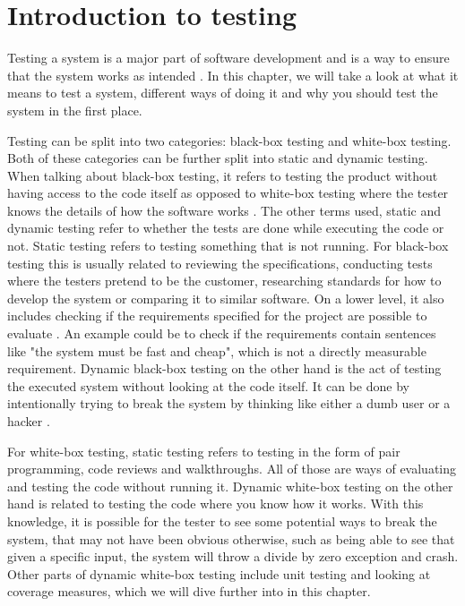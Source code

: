 \section{Introduction to testing}
Testing a system is a major part of software development and is a way to ensure that the system works as intended \cite{SoftwareTesting}.
In this chapter, we will take a look at what it means to test a system, different ways of doing it and why you should test the system in the first place.

Testing can be split into two categories: black-box testing and white-box testing.
Both of these categories can be further split into static and dynamic testing.
When talking about black-box testing, it refers to testing the product without having access to the code itself as opposed to white-box testing where the tester knows the details of how the software works \cite{SoftwareTesting}.
The other terms used, static and dynamic testing refer to whether the tests are done while executing the code or not.
Static testing refers to testing something that is not running.
For black-box testing this is usually related to reviewing the specifications, conducting tests where the testers pretend to be the customer, researching standards for how to develop the system or comparing it to similar software.
On a lower level, it also includes checking if the requirements specified for the project are possible to evaluate \cite{ToVSlides1}.
An example could be to check if the requirements contain sentences like "the system must be fast and cheap", which is not a directly measurable requirement.
Dynamic black-box testing on the other hand is the act of testing the executed system without looking at the code itself.
It can be done by intentionally trying to break the system by thinking like either a dumb user or a hacker \cite{SoftwareTesting}.

For white-box testing, static testing refers to testing in the form of pair programming, code reviews and walkthroughs.
All of those are ways of evaluating and testing the code without running it.
Dynamic white-box testing on the other hand is related to testing the code where you know how it works.
With this knowledge, it is possible for the tester to see some potential ways to break the system, that may not have been obvious otherwise, such as being able to see that given a specific input, the system will throw a divide by zero exception and crash\cite{ToVSlides1}.
Other parts of dynamic white-box testing include unit testing and looking at coverage measures, which we will dive further into in this chapter.
